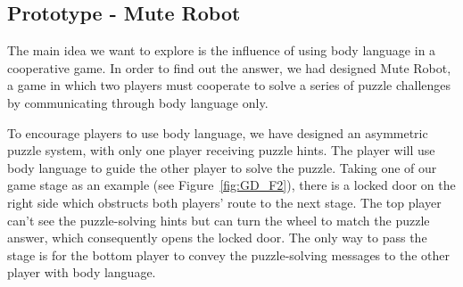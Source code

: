 



\subsection{Prototype - Mute Robot}


The main idea we want to explore is the influence of using body language in a cooperative game. In order to find out the answer, we had designed Mute Robot, a game in which two players must cooperate to solve a series of puzzle challenges by communicating through body language only.

To encourage players to use body language, we have designed an asymmetric puzzle system, with only one player receiving puzzle hints. The player will use body language to guide the other player to solve the puzzle. Taking one of our game stage as an example (see Figure~\ref{fig:GD_F2}), there is a locked door on the right side which obstructs both players' route to the next stage. The top player can't see the puzzle-solving hints but can turn the wheel to match the puzzle answer, which consequently opens the locked door. The only way to pass the stage is for the bottom player to convey the puzzle-solving messages to the other player with body language.

